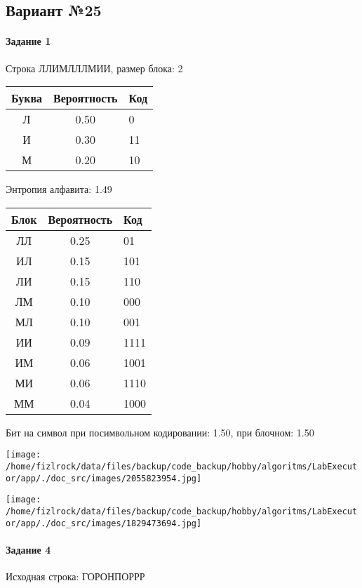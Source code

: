 \documentclass[a4paper, 12pt]{article}
\begin{document}
\subsection{Вариант №25}
\paragraph{Задание 1}

Строка ЛЛИМЛЛЛМИИ, размер блока: 2
\begin{center}
 \begin{tabular}{ |c|c|l| } 
  \hline
     Буква & Вероятность & Код\\ \hline
Л & 0.50 & 0\\\hline
И & 0.30 & 11\\\hline
М & 0.20 & 10
\\ \hline \end{tabular}
\end{center}
Энтропия алфавита: 1.49
\begin{center}
 \begin{tabular}{ |c|c|l| } 
  \hline
     Блок & Вероятность & Код\\ \hline
ЛЛ & 0.25 & 01\\\hline
ИЛ & 0.15 & 101\\\hline
ЛИ & 0.15 & 110\\\hline
ЛМ & 0.10 & 000\\\hline
МЛ & 0.10 & 001\\\hline
ИИ & 0.09 & 1111\\\hline
ИМ & 0.06 & 1001\\\hline
МИ & 0.06 & 1110\\\hline
ММ & 0.04 & 1000
\\ \hline \end{tabular}
\end{center}
Бит на символ при посимвольном кодировании: 1.50, при блочном: 1.50

\texttt{[image: /home/fizlrock/data/files/backup/code\_backup/hobby/algoritms/LabExecutor/app/./doc\_src/images/2055823954.jpg]}

\texttt{[image: /home/fizlrock/data/files/backup/code\_backup/hobby/algoritms/LabExecutor/app/./doc\_src/images/1829473694.jpg]}
\paragraph{Задание 4}


Исходная строка: ГОРОНПОРРР
\end{document}
